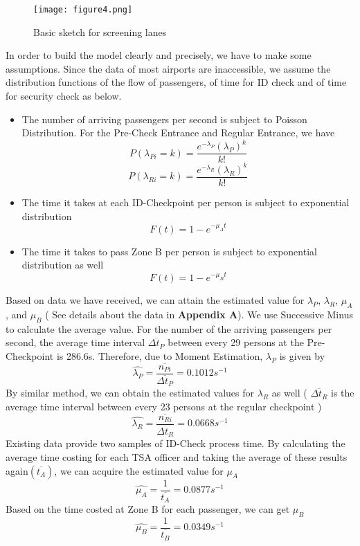 \documentclass{mcmthesis}
\begin{document}
\begin{figure}[h]
\small
\centering
\texttt{[image: figure4.png]}
\caption{Basic sketch for screening lanes} \label{fig:Basic sketch for screening lanes}
\end{figure}
In order to build the model clearly and precisely, we have to make some assumptions. Since the data of most airports are inaccessible, we assume the distribution functions of the flow of passengers, of time for ID check and of time for security check as below.
\begin{itemize}
\item The number of arriving passengers per second is subject to Poisson Distribution. For the Pre-Check Entrance and Regular Entrance, we have
$$P(\lambda_{Pi}=k)=\frac{e^{-\lambda_P}(\lambda_P)^k}{k!}$$
$$P(\lambda_{Ri}=k)=\frac{e^{-\lambda_R}(\lambda_R)^k}{k!}$$
\item The time it takes at each ID-Checkpoint per person is subject to exponential distribution
$$F(t)=1-e^{-\mu_At}$$
\item The time it takes to pass Zone B per person is subject to exponential distribution as well
$$F(t)=1-e^{-\mu_Bt}$$
\end{itemize}

Based on data we have received, we can attain the estimated value for $\lambda_P$, $\lambda_R$, $\mu_A$, and $\mu_B$ ( See details about the data in \textbf{Appendix A}). We use Successive Minus to calculate the average value. For the number of the arriving passengers per second, the average time interval $\overline{\Delta t_P}$ between every 29 persons at the Pre-Checkpoint is 286.6s. Therefore, due to Moment Estimation, $\lambda_P$ is given by
$$\widehat{\lambda_P}=\frac{\overline{n_{Pi}}}{\overline{\Delta t_P}}=0.1012s^{-1}$$
By similar method, we can obtain the estimated values for $\lambda_R$ as well ( $\overline{\Delta t_R}$ is the average time interval between every 23 persons at the regular checkpoint )
$$\widehat{\lambda_R}=\frac{\overline{n_{Ri}}}{\overline{\Delta t_R}}=0.0668s^{-1}$$
Existing data provide two samples of ID-Check process time. By calculating the average time costing for each TSA officer and taking the average of these results again$(\overline{t_A})$, we can acquire the estimated value for $\mu_A$
$$\widehat{\mu_A}=\frac{1}{\overline{t_A}}=0.0877s^{-1}$$
Based on the time costed at Zone B for each passenger, we can get $\mu_B$
$$\widehat{\mu_B}=\frac{1}{\overline{t_B}}=0.0349s^{-1}$$
\end{document}
